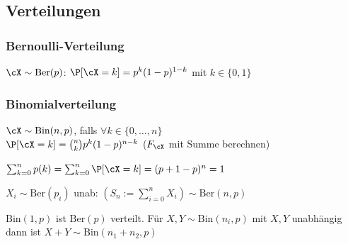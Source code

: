 \newpage
\subsection{Verteilungen}
\subsubsection{Bernoulli-Verteilung}
\shortdefinition $\cX \sim \text{Ber}(p)$: $\P[\cX = k] = p^k(1 - p)^{1 - k}$ mit $k \in \{ 0, 1 \}$


\subsubsection{Binomialverteilung}
\shortdefinition $\cX \sim \text{Bin}(n, p)$, falls $\forall k \in \{ 0, \ldots, n \}$\\
$\P[\cX = k] = {n \choose k} p^k (1 - p)^{n - k}$ ($F_\cX$ mit Summe berechnen)

\shortremark $\sum_{k = 0}^{n} p(k) = \sum_{k = 0}^{n} \P[\cX = k] = (p + 1 - p)^n = 1$

\shorttheorem $X_i \sim \text{Ber}(p_i)$ unab: $(S_n := \sum_{i = 0}^{n} X_i) \sim \text{Ber}(n, p)$

\shortremark $\text{Bin}(1, p)$ ist $\text{Ber}(p)$ verteilt. Für $X, Y \sim \text{Bin}(n_i, p)$ mit $X, Y$ unabhängig dann ist $X + Y \sim \text{Bin}(n_1 + n_2, p)$

